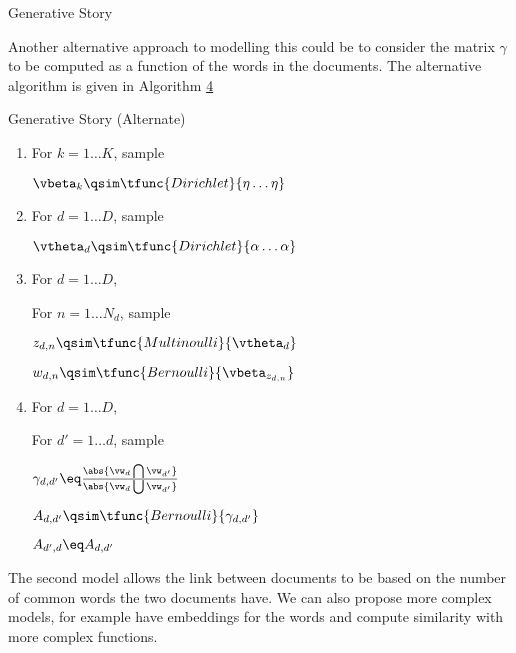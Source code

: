 \documentclass{article}
\begin{document}
\begin{question}
\begin{algo}[0.9\textwidth]{Generative Story}
\begin{enumerate}
		\end{enumerate}

	\end{algo}

	Another alternative approach to modelling this could be to consider the matrix $\gamma$ to be computed as a function of the words in the documents. The alternative algorithm is given in Algorithm \hyperlink{algo:4}{4}

	\begin{algo}[0.9\textwidth]{Generative Story (Alternate)}

		\begin{enumerate}
			\item For $k = 1 \dots K$, sample \sbr

				\hspace{1.5em} $\vbeta_k \qsim \tfunc{Dirichlet}{\eta \dots \eta}$ \sbr

			\item For $d = 1 \dots D$, sample \sbr

				\hspace{1.5em} $\vtheta_d \qsim \tfunc{Dirichlet}{\alpha \dots \alpha}$ \sbr

			\item For $d = 1 \dots D$,

				\begin{addmargin}{1em}
					For $n = 1 \dots N_d$, sample \sbr

					\begin{addmargin}{1.5em}
						$z_{d, n} \qsim \tfunc{Multinoulli}{\vtheta_d}$

						$w_{d, n} \qsim \tfunc{Bernoulli}{\vbeta_{z_{d, n}}}$ \sbr

					\end{addmargin}
				\end{addmargin}

			\item For $d = 1 \dots D$,

				\begin{addmargin}{1em}
					For $d' = 1 \dots d$, sample \sbr

					\begin{addmargin}{1.5em}

						$\gamma_{d, d'} \eq \frac{\abs{\vw_{d} \bigcap \vw_{d'}}}{\abs{\vw_{d} \bigcup \vw_{d'}}}$

						$A_{d, d'} \qsim \tfunc{Bernoulli}{\gamma_{d, d'}}$

						$A_{d', d} \eq A_{d, d'}$

					\end{addmargin}
				\end{addmargin}

		\end{enumerate}

	\end{algo}

	The second model allows the link between documents to be based on the number of common words the two documents have. We can also propose more complex models, for example have embeddings for the words and compute similarity with more complex functions.

\end{question}
\end{document}
